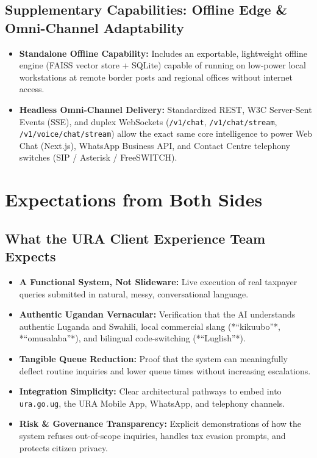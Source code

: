 \documentclass[10pt,a4paper]{article}
\begin{document}
\subsection{Supplementary Capabilities: Offline Edge \& Omni-Channel Adaptability}
\begin{itemize}
  \item \textbf{Standalone Offline Capability:} Includes an exportable, lightweight offline engine (FAISS vector store + SQLite) capable of running on low-power local workstations at remote border posts and regional offices without internet access.
  \item \textbf{Headless Omni-Channel Delivery:} Standardized REST, W3C Server-Sent Events (SSE), and duplex WebSockets (\texttt{/v1/chat}, \texttt{/v1/chat/stream}, \texttt{/v1/voice/chat/stream}) allow the exact same core intelligence to power Web Chat (Next.js), WhatsApp Business API, and Contact Centre telephony switches (SIP / Asterisk / FreeSWITCH).
\end{itemize}

\section{Expectations from Both Sides}

\subsection{What the URA Client Experience Team Expects}
\begin{itemize}
  \item \textbf{A Functional System, Not Slideware:} Live execution of real taxpayer queries submitted in natural, messy, conversational language.
  \item \textbf{Authentic Ugandan Vernacular:} Verification that the AI understands authentic Luganda and Swahili, local commercial slang (*``kikuubo''*, *``omusalaba''*), and bilingual code-switching (*``Luglish''*).
  \item \textbf{Tangible Queue Reduction:} Proof that the system can meaningfully deflect routine inquiries and lower queue times without increasing escalations.
  \item \textbf{Integration Simplicity:} Clear architectural pathways to embed into \texttt{ura.go.ug}, the URA Mobile App, WhatsApp, and telephony channels.
  \item \textbf{Risk \& Governance Transparency:} Explicit demonstrations of how the system refuses out-of-scope inquiries, handles tax evasion prompts, and protects citizen privacy.
\end{itemize}
\end{document}
